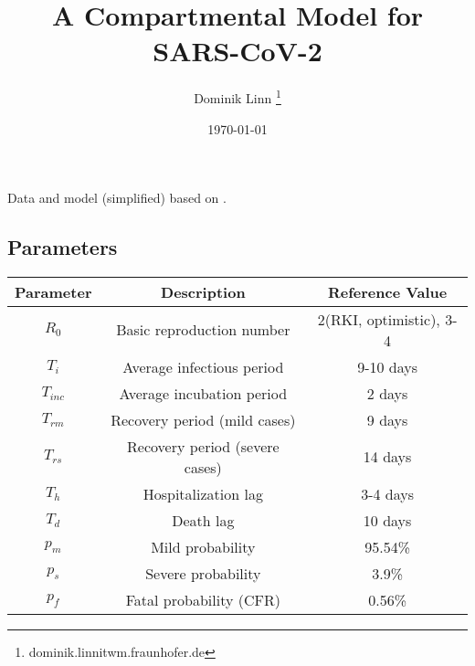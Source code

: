 \documentclass[a4, 12pt, colorinlistoftodos]{scrartcl}
\title{A Compartmental Model for SARS-CoV-2}
\author{Dominik Linn \footnote{dominik.linn\@ itwm.fraunhofer.de}}
\date{\today}
\begin{document}
	
	\maketitle
	
	
	Data and model (simplified) based on \cite{RKI_Corona2020}.
	
	\subsection*{Parameters}
	\begin{center}
		\begin{tabular}{c | c | c}
			\textbf{Parameter} & \textbf{Description} & \textbf{Reference Value} \\ \hline
			$R_0$ & Basic reproduction number & 2(RKI, optimistic),  3-4  \\
			$T_i$ & Average infectious period & 9-10  days\\
			$T_{inc}$ &  Average incubation period & 2  days\\
			$T_{rm}$ & Recovery period (mild cases) & 9  days\\
			$T_{rs}$ & Recovery period (severe cases) & 14 days\\
			$T_{h}$ & Hospitalization lag& 3-4  days\\
			$T_{d}$ & Death lag & 10  days \\
			$p_m$ & Mild probability  & 95.54\%\\
			$p_s$ & Severe probability & 3.9\%\\
			$p_f$ & Fatal probability (CFR) &  0.56\%
		\end{tabular}
	\end{center}
	
\end{document}
